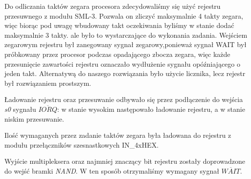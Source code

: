 \documentclass[fleqn]{article}
\begin{document}
Do odliczania taktów zegara procesora zdecydowaliśmy się użyć rejestru przesuwnego z modułu SML-3. Pozwala on zliczyć maksymalnie 4 takty zegara, więc biorąc pod uwagę wbudowany takt oczekiwania byliśmy w stanie dodać maksymalnie 3 takty. ale było to wystarczające do wykonania zadania. Wejściem zegarowym rejestru był zanegowany sygnał zegarowy,ponieważ sygnał WAIT był próbkowany przez procesor podczas opadającego zbocza zegara, więc każde przesunięcie zawartości rejestru oznaczało wydłużenie sygnału opóźniającego o jeden takt.  Alternatywą do naszego rozwiązania było użycie licznika, lecz rejestr był rozwiązaniem prostszym.

Ładowanie rejestru oraz przesuwanie odbywało się przez podłączenie do wejścia \textit{s0} sygnału $\overline{IORQ}$: w stanie wysokim następowało ładowanie rejestru, a w stanie niskim przesuwanie.

Ilość wymaganych przez zadanie taktów zegara była ładowana do rejestru z modułu przełączników szesnastkowych IN\_4xHEX.

Wyjście multipleksera oraz najmniej znaczący bit rejestru zostały doprowadzone do wejść bramki \textit{NAND}. W ten sposób otrzymaliśmy wymagany sygnał $\overline{WAIT}$.

\end{document}
